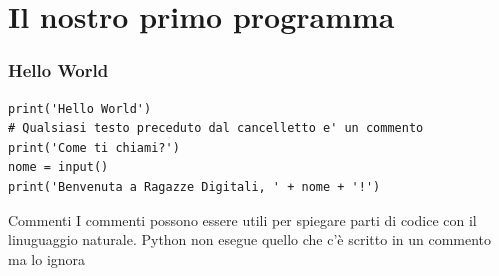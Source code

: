 \documentclass{beamer}
\begin{document}
\section{Il nostro primo programma}

\begin{frame}[fragile]
\frametitle{Hello World}

    \begin{lstlisting}
print('Hello World')
# Qualsiasi testo preceduto dal cancelletto e' un commento
print('Come ti chiami?')
nome = input()
print('Benvenuta a Ragazze Digitali, ' + nome + '!')
    \end{lstlisting}

\end{frame}

\begin{frame}{Commenti}
        I commenti possono essere utili per spiegare parti di codice con il linuguaggio naturale.
        Python non esegue quello che c'è scritto in un commento ma lo ignora
\end{frame}
\end{document}
